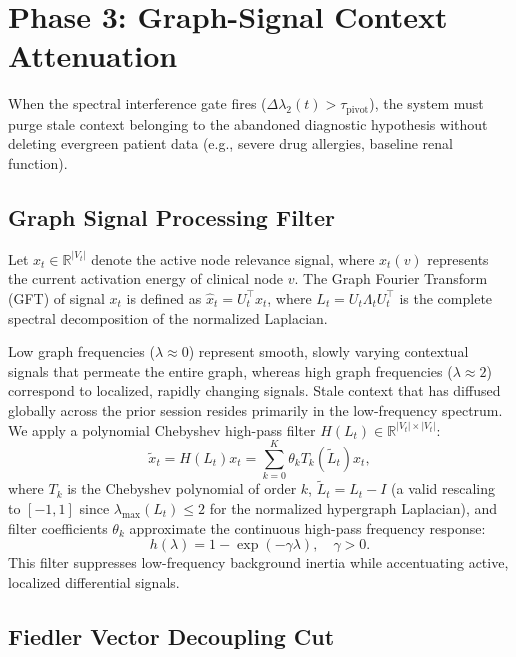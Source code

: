 \documentclass[10pt, onecolumn]{article}
\newcommand{\R}{\mathbb{R}}
\begin{document}
\section{Phase 3: Graph-Signal Context Attenuation}
\label{sec:phase3}

When the spectral interference gate fires ($\Delta \lambda_2(t) > \tau_{\text{pivot}}$), the system must purge stale context belonging to the abandoned diagnostic hypothesis without deleting evergreen patient data (e.g., severe drug allergies, baseline renal function).

\subsection{Graph Signal Processing Filter}

Let $x_t \in \R^{|V_t|}$ denote the active node relevance signal, where $x_t(v)$ represents the current activation energy of clinical node $v$. The Graph Fourier Transform (GFT) of signal $x_t$ is defined as $\hat{x}_t = U_t^\top x_t$, where $L_t = U_t \Lambda_t U_t^\top$ is the complete spectral decomposition of the normalized Laplacian.

Low graph frequencies ($\lambda \approx 0$) represent smooth, slowly varying contextual signals that permeate the entire graph, whereas high graph frequencies ($\lambda \approx 2$) correspond to localized, rapidly changing signals. Stale context that has diffused globally across the prior session resides primarily in the low-frequency spectrum. We apply a polynomial Chebyshev high-pass filter $H(L_t) \in \R^{|V_t| \times |V_t|}$:
\begin{equation}
  \tilde{x}_t = H(L_t) x_t = \sum_{k=0}^{K} \theta_k T_k(\tilde{L}_t) x_t,
  \label{eq:chebyshev_filter}
\end{equation}
where $T_k$ is the Chebyshev polynomial of order $k$, $\tilde{L}_t = L_t - I$ (a valid rescaling to $[-1,1]$ since $\lambda_{\max}(L_t) \le 2$ for the normalized hypergraph Laplacian), and filter coefficients $\theta_k$ approximate the continuous high-pass frequency response:
\begin{equation}
  h(\lambda) = 1 - \exp(-\gamma \lambda), \quad \gamma > 0.
  \label{eq:freq_response}
\end{equation}
This filter suppresses low-frequency background inertia while accentuating active, localized differential signals.

\subsection{Fiedler Vector Decoupling Cut}
\end{document}
